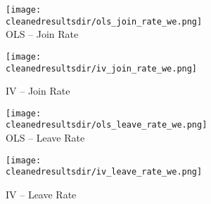 \documentclass{article}
\newcommand{\cleanedresultsdir}{../../results/cleaned}
\begin{document}
\clearpage

\begin{figure}[H]
  \centering
  \texttt{[image: \\cleanedresultsdir/ols\_join\_rate\_we.png]}\\[2pt]
  \caption*{OLS – Join Rate}
  \texttt{[image: \\cleanedresultsdir/iv\_join\_rate\_we.png]}\\[2pt]
  \caption*{IV – Join Rate}
\end{figure}

\clearpage

\begin{figure}[H]
  \centering
  \texttt{[image: \\cleanedresultsdir/ols\_leave\_rate\_we.png]}\\[2pt]
  \caption*{OLS – Leave Rate}
  \texttt{[image: \\cleanedresultsdir/iv\_leave\_rate\_we.png]}\\[2pt]
  \caption*{IV – Leave Rate}
\end{figure}
\end{document}
